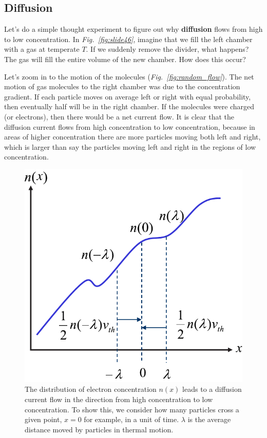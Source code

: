 \subsection{Diffusion}
Let’s do a simple thought experiment to figure out why \textbf{diffusion} flows from high to low concentration.  In \emph{Fig.~\ref{fig:slide46}}, imagine that we fill the left chamber with a gas at temperate $T$. If we suddenly remove the divider, what happens?  The gas will fill the entire volume of the new chamber. How does this occur?

Let’s zoom in to the motion of the molecules (\emph{Fig.~\ref{fig:random_flow}}).  The net motion of gas molecules to the right chamber was due to the concentration gradient.  If each particle moves on average left or right with equal probability, then eventually half will be in the right chamber. If the molecules were charged (or electrons), then there would be a net current flow.  It is clear that the diffusion current flows from high concentration to low concentration, because in areas of higher concentration there are more particles moving both left and right, which is larger than say the particles moving left and right in the regions of low concentration.
\newpage
\begin{figure}[tb]
\centering
\includegraphics[width=.45\columnwidth]{slide48}
\caption{The distribution of electron concentration $n(x)$ leads to a diffusion current flow in the direction from high concentration to low concentration.  To show this, we consider how many particles cross a given point, $x=0$ for example, in a unit of time.  $\lambda$ is the average distance moved by particles in thermal motion.}
\label{fig:slide48}
\end{figure}
